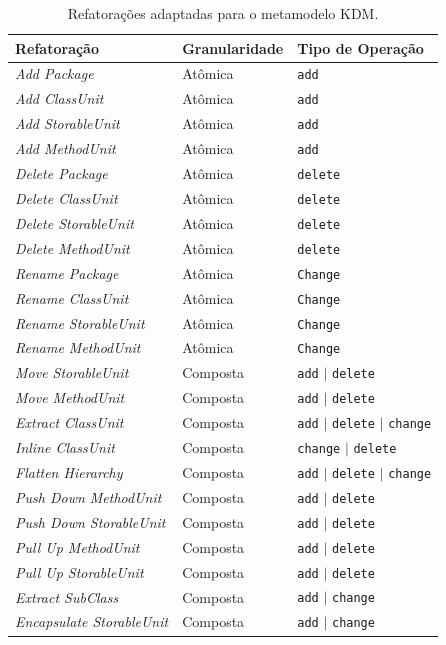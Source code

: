 \begin{table}[h]
\caption{Refatorações adaptadas para o metamodelo KDM.\label{tab:refatoringsCatalogo}}
\begin{center}
\begin{tabular}{ | m{4.5cm} | m{2.5cm} | m{4cm}| } 
\hline
Refatoração & Granularidade & Tipo de Operação\\ 
\hline
\textit{Add Package} &  Atômica & \texttt{add}\\ 
\hline
\textit{Add ClassUnit} &  Atômica & \texttt{add}\\ 
\hline
\textit{Add StorableUnit} &  Atômica & \texttt{add}\\ 
\hline
\textit{Add MethodUnit} &  Atômica & \texttt{add}\\ 
\hline
\textit{Delete Package} &  Atômica & \texttt{delete}\\ 
\hline
\textit{Delete ClassUnit} &  Atômica & \texttt{delete}\\ 
\hline
\textit{Delete StorableUnit} &  Atômica & \texttt{delete}\\ 
\hline
\textit{Delete MethodUnit} &  Atômica & \texttt{delete}\\ 
\hline
\textit{Rename Package} &  Atômica & \texttt{Change}\\ 
\hline
\textit{Rename ClassUnit} &  Atômica & \texttt{Change}\\ 
\hline
\textit{Rename StorableUnit} &  Atômica & \texttt{Change}\\ 
\hline
\textit{Rename MethodUnit} &  Atômica & \texttt{Change}\\ 
\hline
\textit{Move StorableUnit} &  Composta & \texttt{add} $|$ \texttt{delete}\\ 
\hline
\textit{Move MethodUnit} &  Composta & \texttt{add} $|$ \texttt{delete}\\ 
\hline
\textit{Extract ClassUnit} &  Composta & \texttt{add} $|$ \texttt{delete} $|$ \texttt{change}\\
\hline
\textit{Inline ClassUnit} &  Composta & \texttt{change} $|$ \texttt{delete}\\ 
\hline
\textit{Flatten Hierarchy} &  Composta & \texttt{add} $|$ \texttt{delete} $|$ \texttt{change}\\ 
\hline
\textit{Push Down MethodUnit} &  Composta & \texttt{add} $|$ \texttt{delete}\\ 
\hline
\textit{Push Down StorableUnit} &  Composta & \texttt{add} $|$ \texttt{delete}\\ 
\hline
\textit{Pull Up MethodUnit} &  Composta & \texttt{add} $|$ \texttt{delete}\\
\hline
\textit{Pull Up StorableUnit} &  Composta & \texttt{add} $|$ \texttt{delete}\\
\hline
\textit{Extract SubClass} &  Composta & \texttt{add} $|$ \texttt{change}\\
\hline
\textit{Encapsulate StorableUnit} &  Composta & \texttt{add} $|$ \texttt{change}\\
\hline
\end{tabular}
\end{center}
\end{table}


